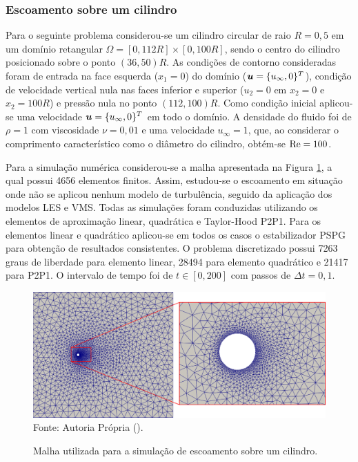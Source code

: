 \subsubsection{Escoamento sobre um cilindro}

Para o seguinte problema considerou-se um cilindro circular de raio $R=0,5$ em um domínio retangular $\Omega=[0,112R]\times[0,100R]$, sendo o centro do cilindro posicionado sobre o ponto $(36,50)R$. As condições de contorno consideradas foram de entrada na face esquerda ($x_1=0$) do domínio ($\boldsymbol{u}=\{u_\infty,0\}^T$), condição de velocidade vertical nula nas faces inferior e superior ($u_2=0$ em $x_2=0$ e $x_2=100R$) e pressão nula no ponto $(112,100)R$. Como condição inicial aplicou-se uma velocidade $\boldsymbol{u}=\{u_\infty,0\}^T$ em todo o domínio. A densidade do fluido foi de $\rho=1$ com viscosidade $\nu=0,01$ e uma velocidade $u_\infty=1$, que, ao considerar o comprimento característico como o diâmetro do cilindro, obtém-se $\mathrm{Re}=100$.

Para a simulação numérica considerou-se a malha apresentada na Figura \ref{fig:cyl-mesh}, a qual possui 4656 elementos finitos. Assim, estudou-se o escoamento em situação onde não se aplicou nenhum modelo de turbulência, seguido da aplicação dos modelos LES e VMS. Todas as simulações foram conduzidas utilizando os elementos de aproximação linear, quadrática e Taylor-Hood P2P1. Para os elementos linear e quadrático aplicou-se em todos os casos o estabilizador PSPG para obtenção de resultados consistentes. O problema discretizado possui 7263 graus de liberdade para elemento linear, 28494 para elemento quadrático e 21417 para P2P1. O intervalo de tempo foi de $t\in[0,200]$ com passos de $\Delta t=0,1$.

\begin{figure}[h!]
    \centering
    \caption{Malha utilizada para a simulação de escoamento sobre um cilindro.}
    \includegraphics[width=\linewidth]{Figuras/cylinder/analise2/mesh.png}
    \\Fonte: Autoria Própria (\the\year).
    \label{fig:cyl-mesh}
\end{figure}

